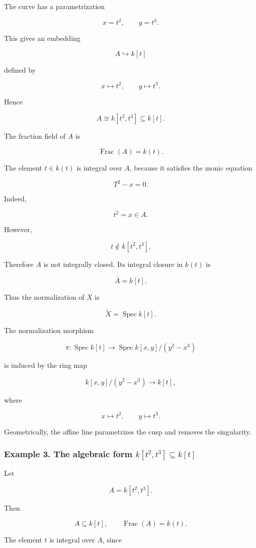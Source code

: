 \documentclass[12pt,a4paper]{article}
\theoremstyle{notespace}
\begin{document}
The curve has a parametrization

\[
x=t^2,
\qquad
y=t^3.
\]

This gives an embedding

\[
A\hookrightarrow k[t]
\]

defined by

\[
x\mapsto t^2,
\qquad
y\mapsto t^3.
\]

Hence

\[
A\cong k[t^2,t^3]\subseteq k[t].
\]

The fraction field of \(A\) is

\[
\operatorname{Frac}(A)=k(t).
\]

The element \(t\in k(t)\) is integral over \(A\), because it satisfies the monic equation

\[
T^2-x=0.
\]

Indeed,

\[
t^2=x\in A.
\]

However,

\[
t\notin k[t^2,t^3].
\]

Therefore \(A\) is not integrally closed. Its integral closure in \(k(t)\) is

\[
\overline{A}=k[t].
\]

Thus the normalization of \(X\) is

\[
\widetilde{X}=\operatorname{Spec}k[t].
\]

The normalization morphism

\[
\pi:\operatorname{Spec}k[t]\to \operatorname{Spec}k[x,y]/(y^2-x^3)
\]

is induced by the ring map

\[
k[x,y]/(y^2-x^3)\to k[t],
\]

where

\[
x\mapsto t^2,
\qquad
y\mapsto t^3.
\]

Geometrically, the affine line parametrizes the cusp and removes the singularity.

\subsubsection{Example 3. The algebraic form \(k[t^2,t^3]\subseteq k[t]\)}

Let

\[
A=k[t^2,t^3].
\]

Then

\[
A\subseteq k[t],
\qquad
\operatorname{Frac}(A)=k(t).
\]

The element \(t\) is integral over \(A\), since
\end{document}
